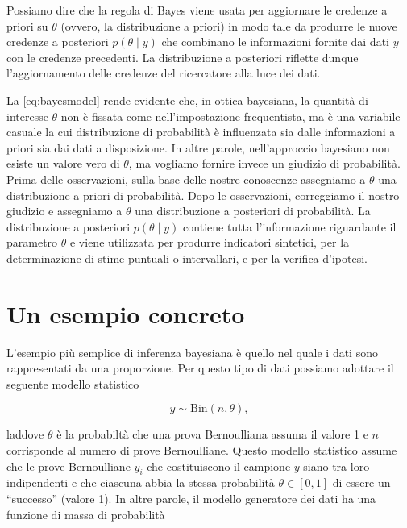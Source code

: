 \documentclass[
]{memoir}
\theoremstyle{definition}
\theoremstyle{definition}
\theoremstyle{definition}
\theoremstyle{definition}
\theoremstyle{remark}
\begin{document}
Possiamo dire che la regola di Bayes viene usata per aggiornare le credenze a priori su \(\theta\) (ovvero, la distribuzione a priori) in modo tale da produrre le nuove credenze a posteriori \(p(\theta \mid y)\) che combinano le informazioni fornite dai dati \(y\) con le credenze precedenti. La distribuzione a posteriori riflette dunque l'aggiornamento delle credenze del ricercatore alla luce dei dati.

La \eqref{eq:bayesmodel} rende evidente che, in ottica bayesiana, la quantità di interesse \(\theta\) non è fissata come nell'impostazione frequentista, ma è una variabile casuale la cui distribuzione di probabilità è influenzata sia dalle informazioni a priori sia dai dati a disposizione. In altre parole, nell'approccio bayesiano non esiste un valore vero di \(\theta\), ma vogliamo fornire invece un giudizio di probabilità. Prima delle osservazioni, sulla base delle nostre conoscenze assegniamo a \(\theta\) una distribuzione a priori di probabilità. Dopo le osservazioni, correggiamo il nostro giudizio e assegniamo a \(\theta\) una distribuzione a posteriori di probabilità. La distribuzione a posteriori \(p(\theta \mid y)\) contiene tutta l'informazione riguardante il parametro \(\theta\) e viene utilizzata per produrre indicatori sintetici, per la determinazione di stime puntuali o intervallari, e per la verifica d'ipotesi.

\hypertarget{un-esempio-concreto}{%
\section{Un esempio concreto}\label{un-esempio-concreto}}

L'esempio più semplice di inferenza bayesiana è quello nel quale i dati sono rappresentati da una proporzione. Per questo tipo di dati possiamo adottare il seguente modello statistico

\begin{equation}
y  \sim \mbox{Bin}(n, \theta),
\label{eq:binomialmodel}
\end{equation}

\noindent
laddove \(\theta\) è la probabiltà che una prova Bernoulliana assuma il valore 1 e \(n\) corrisponde al numero di prove Bernoulliane. Questo modello statistico assume che le prove Bernoulliane \(y_i\) che costituiscono il campione \(y\) siano tra loro indipendenti e che ciascuna abbia la stessa probabilità \(\theta \in [0, 1]\) di essere un ``successo'' (valore 1). In altre parole, il modello generatore dei dati ha una funzione di massa di probabilità
\end{document}
